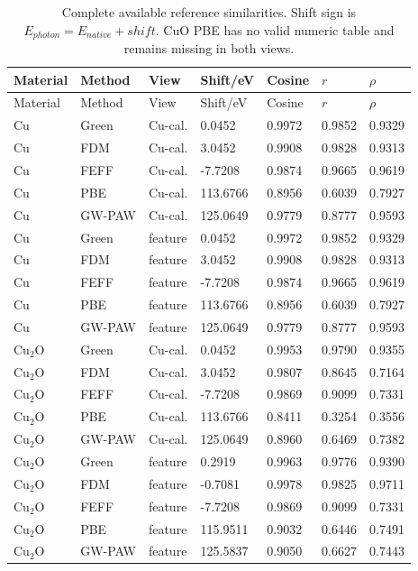 \documentclass[11pt,a4paper]{article}
\begin{document}
\begingroup\footnotesize\setlength{\tabcolsep}{3pt}
\begin{longtable}{lllllll}
\caption{Complete available reference similarities. Shift sign is $E_{photon}=E_{native}+shift$. CuO PBE has no valid numeric table and remains missing in both views.}\\
\toprule
Material & Method & View & Shift/eV & Cosine & $r$ & $\rho$\\\midrule\endfirsthead
Material & Method & View & Shift/eV & Cosine & $r$ & $\rho$\\\midrule\endhead
Cu & Green & Cu-cal. & 0.0452 & 0.9972 & 0.9852 & 0.9329\\
Cu & FDM & Cu-cal. & 3.0452 & 0.9908 & 0.9828 & 0.9313\\
Cu & FEFF & Cu-cal. & -7.7208 & 0.9874 & 0.9665 & 0.9619\\
Cu & PBE & Cu-cal. & 113.6766 & 0.8956 & 0.6039 & 0.7927\\
Cu & GW-PAW & Cu-cal. & 125.0649 & 0.9779 & 0.8777 & 0.9593\\
Cu & Green & feature & 0.0452 & 0.9972 & 0.9852 & 0.9329\\
Cu & FDM & feature & 3.0452 & 0.9908 & 0.9828 & 0.9313\\
Cu & FEFF & feature & -7.7208 & 0.9874 & 0.9665 & 0.9619\\
Cu & PBE & feature & 113.6766 & 0.8956 & 0.6039 & 0.7927\\
Cu & GW-PAW & feature & 125.0649 & 0.9779 & 0.8777 & 0.9593\\
Cu$_2$O & Green & Cu-cal. & 0.0452 & 0.9953 & 0.9790 & 0.9355\\
Cu$_2$O & FDM & Cu-cal. & 3.0452 & 0.9807 & 0.8645 & 0.7164\\
Cu$_2$O & FEFF & Cu-cal. & -7.7208 & 0.9869 & 0.9099 & 0.7331\\
Cu$_2$O & PBE & Cu-cal. & 113.6766 & 0.8411 & 0.3254 & 0.3556\\
Cu$_2$O & GW-PAW & Cu-cal. & 125.0649 & 0.8960 & 0.6469 & 0.7382\\
Cu$_2$O & Green & feature & 0.2919 & 0.9963 & 0.9776 & 0.9390\\
Cu$_2$O & FDM & feature & -0.7081 & 0.9978 & 0.9825 & 0.9711\\
Cu$_2$O & FEFF & feature & -7.7208 & 0.9869 & 0.9099 & 0.7331\\
Cu$_2$O & PBE & feature & 115.9511 & 0.9032 & 0.6446 & 0.7491\\
Cu$_2$O & GW-PAW & feature & 125.5837 & 0.9050 & 0.6627 & 0.7443\\

\end{longtable}
\end{document}
